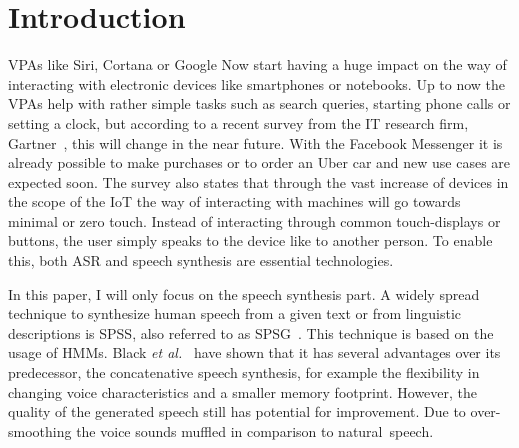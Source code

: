 

\section{Introduction}
\label{sec:introduction}

\acp{VPA} like Siri, Cortana or Google Now start having a huge impact on the way of interacting with electronic devices like smartphones or notebooks. Up to now the \acp{VPA} help with rather simple tasks such as search queries, starting phone calls or setting a clock, but according to a recent survey from the IT research firm, Gartner~\cite{gartner:assistants}, this will change in the near future. With the Facebook Messenger it is already possible to make purchases or to order an Uber car and new use cases are expected soon. The survey also states that through the vast increase of devices in the scope of the \ac{IoT} the way of interacting with machines will go towards minimal or zero touch. Instead of interacting through common touch-displays or buttons, the user simply speaks to the device like to another person. To enable this, both \ac{ASR} and speech synthesis are essential technologies.

In this paper, I will only focus on the speech synthesis part. A widely spread technique to synthesize human speech from a given text or from linguistic descriptions is \acf{SPSS}, also referred to as \ac{SPSG}~\cite{ling:deep}. This technique is based on the usage of \acp{HMM}. Black \textit{et al.}~\cite{black:statistical} have shown that it has several advantages over its predecessor, the concatenative speech synthesis, for example the flexibility in changing voice characteristics and a smaller memory footprint. However, the quality of the generated speech still has potential for improvement. Due to over-smoothing the voice sounds muffled in comparison to natural~speech.

